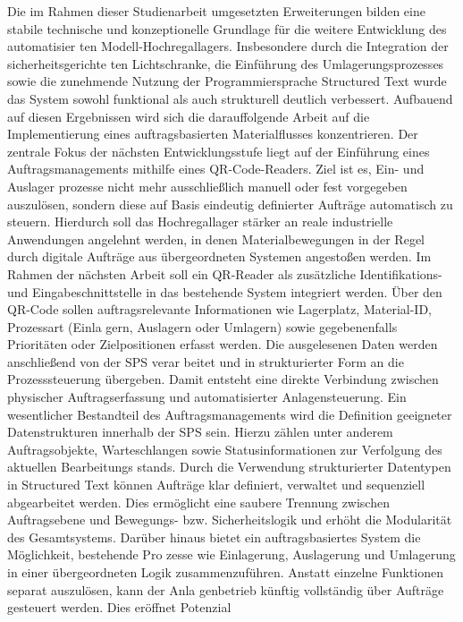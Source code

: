 Die im Rahmen dieser Studienarbeit umgesetzten Erweiterungen bilden eine stabile
technische und konzeptionelle Grundlage für die weitere Entwicklung des automatisier
ten Modell-Hochregallagers. Insbesondere durch die Integration der sicherheitsgerichte
ten Lichtschranke, die Einführung des Umlagerungsprozesses sowie die zunehmende
Nutzung der Programmiersprache Structured Text wurde das System sowohl funktional
als auch strukturell deutlich verbessert. Aufbauend auf diesen Ergebnissen wird sich die
darauffolgende Arbeit auf die Implementierung eines auftragsbasierten Materialflusses
konzentrieren.
Der zentrale Fokus der nächsten Entwicklungsstufe liegt auf der Einführung eines
Auftragsmanagements mithilfe eines QR-Code-Readers. Ziel ist es, Ein- und Auslager
prozesse nicht mehr ausschließlich manuell oder fest vorgegeben auszulösen, sondern
diese auf Basis eindeutig definierter Aufträge automatisch zu steuern. Hierdurch soll
das Hochregallager stärker an reale industrielle Anwendungen angelehnt werden, in
denen Materialbewegungen in der Regel durch digitale Aufträge aus übergeordneten
Systemen angestoßen werden.
Im Rahmen der nächsten Arbeit soll ein QR-Reader als zusätzliche Identifikations- und
Eingabeschnittstelle in das bestehende System integriert werden. Über den QR-Code
sollen auftragsrelevante Informationen wie Lagerplatz, Material-ID, Prozessart (Einla
gern, Auslagern oder Umlagern) sowie gegebenenfalls Prioritäten oder Zielpositionen
erfasst werden. Die ausgelesenen Daten werden anschließend von der SPS verar
beitet und in strukturierter Form an die Prozesssteuerung übergeben. Damit entsteht
eine direkte Verbindung zwischen physischer Auftragserfassung und automatisierter
Anlagensteuerung.
Ein wesentlicher Bestandteil des Auftragsmanagements wird die Definition geeigneter
Datenstrukturen innerhalb der SPS sein. Hierzu zählen unter anderem Auftragsobjekte,
Warteschlangen sowie Statusinformationen zur Verfolgung des aktuellen Bearbeitungs
stands. Durch die Verwendung strukturierter Datentypen in Structured Text können
Aufträge klar definiert, verwaltet und sequenziell abgearbeitet werden. Dies ermöglicht
eine saubere Trennung zwischen Auftragsebene und Bewegungs- bzw. Sicherheitslogik
und erhöht die Modularität des Gesamtsystems.
Darüber hinaus bietet ein auftragsbasiertes System die Möglichkeit, bestehende Pro
zesse wie Einlagerung, Auslagerung und Umlagerung in einer übergeordneten Logik
zusammenzuführen. Anstatt einzelne Funktionen separat auszulösen, kann der Anla
genbetrieb künftig vollständig über Aufträge gesteuert werden. Dies eröffnet Potenzial
